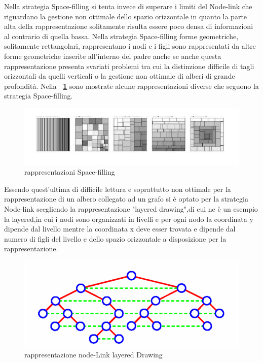 {Nella strategia Space-filling si tenta invece di superare i limiti del Node-link che riguardano la gestione non ottimale dello spazio orizzontale in quanto la parte alta della rappresentazione solitamente risulta essere poco densa di informazioni al contrario di quella bassa. Nella strategia Space-filling forme geometriche, solitamente rettangolari, rappresentano i nodi e i figli sono rappresentati da altre forme geometriche inserite all'interno del padre anche se anche questa rappresentazione presenta svariati problemi tra cui la distinzione difficile di tagli orizzontali da quelli verticali o la gestione non ottimale di alberi di grande profondità. Nella \textbf{\figurename~\ref{fig:spaceFilling}} sono mostrate alcune rappresentazioni diverse che seguono la strategia Space-filling.
\begin{figure}[!htb]
	\begin{center}
		\includegraphics[width=0.9 \linewidth]{figure/spaceFilling}
	\end{center}
	\caption{rappresentazioni Space-filling\label{fig:spaceFilling}}
\end{figure}
\newline
Essendo quest'ultima di difficile lettura e soprattutto non ottimale per la rappresentazione di un albero collegato ad un grafo si è optato per la strategia Node-link scegliendo la rappresentazione "layered drawing",di cui ne è un esempio la \figurename{layered},in cui i nodi sono organizzati in livelli e per ogni nodo la coordinata y dipende dal livello mentre la coordinata x deve esser trovata e dipende dal numero di figli del livello e dello spazio orizzontale a disposizione per la rappresentazione.

\begin{figure}[!htb]
	\begin{center}
		\includegraphics[width=0.9 \linewidth]{figure/layered}
	\end{center}
	\caption{rappresentazione node-Link layered Drawing\label{fig:layered}}
\end{figure}
}
